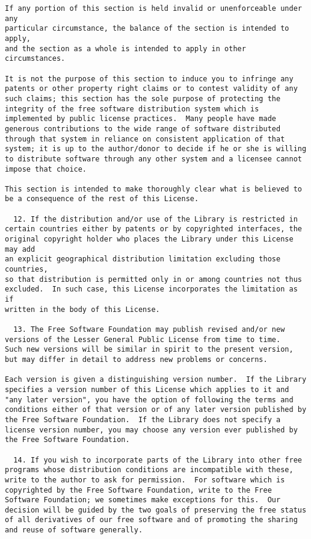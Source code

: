 \documentclass{InsightBook}
\begin{document}
\begin{verbatim}
If any portion of this section is held invalid or unenforceable under any
particular circumstance, the balance of the section is intended to apply,
and the section as a whole is intended to apply in other circumstances.

It is not the purpose of this section to induce you to infringe any
patents or other property right claims or to contest validity of any
such claims; this section has the sole purpose of protecting the
integrity of the free software distribution system which is
implemented by public license practices.  Many people have made
generous contributions to the wide range of software distributed
through that system in reliance on consistent application of that
system; it is up to the author/donor to decide if he or she is willing
to distribute software through any other system and a licensee cannot
impose that choice.

This section is intended to make thoroughly clear what is believed to
be a consequence of the rest of this License.

  12. If the distribution and/or use of the Library is restricted in
certain countries either by patents or by copyrighted interfaces, the
original copyright holder who places the Library under this License may add
an explicit geographical distribution limitation excluding those countries,
so that distribution is permitted only in or among countries not thus
excluded.  In such case, this License incorporates the limitation as if
written in the body of this License.

  13. The Free Software Foundation may publish revised and/or new
versions of the Lesser General Public License from time to time.
Such new versions will be similar in spirit to the present version,
but may differ in detail to address new problems or concerns.

Each version is given a distinguishing version number.  If the Library
specifies a version number of this License which applies to it and
"any later version", you have the option of following the terms and
conditions either of that version or of any later version published by
the Free Software Foundation.  If the Library does not specify a
license version number, you may choose any version ever published by
the Free Software Foundation.

  14. If you wish to incorporate parts of the Library into other free
programs whose distribution conditions are incompatible with these,
write to the author to ask for permission.  For software which is
copyrighted by the Free Software Foundation, write to the Free
Software Foundation; we sometimes make exceptions for this.  Our
decision will be guided by the two goals of preserving the free status
of all derivatives of our free software and of promoting the sharing
and reuse of software generally.


\end{verbatim}
\end{document}
